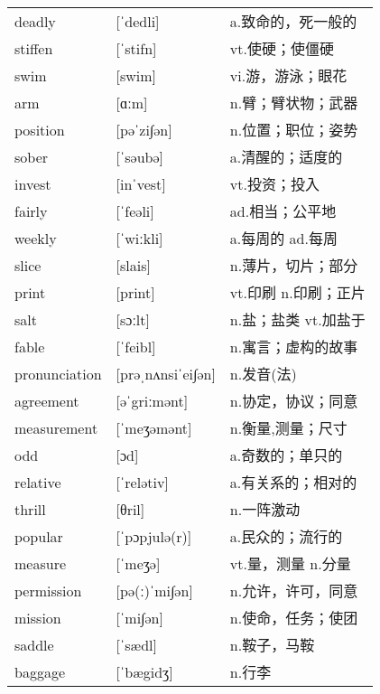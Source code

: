 \documentclass[a4paper]{article}
\begin{document}
\section{}
\begin{tabular}{l l l}

deadly & [ˈdedli] & a.致命的，死一般的 \\
stiffen & [ˈstifn] & vt.使硬；使僵硬 \\
swim & [swim] & vi.游，游泳；眼花 \\
arm & [ɑːm] & n.臂；臂状物；武器 \\
position & [pəˈzi∫ən] & n.位置；职位；姿势 \\
sober & [ˈsəubə] & a.清醒的；适度的 \\
invest & [inˈvest] & vt.投资；投入 \\
fairly & [ˈfeəli] & ad.相当；公平地 \\
weekly & [ˈwiːkli] & a.每周的 ad.每周 \\
slice & [slais] & n.薄片，切片；部分 \\
print & [print] & vt.印刷 n.印刷；正片 \\
salt & [sɔːlt] & n.盐；盐类 vt.加盐于 \\
fable & [ˈfeibl] & n.寓言；虚构的故事 \\
pronunciation & [prəˌnʌnsiˈei∫ən] & n.发音(法) \\
agreement & [əˈgriːmənt] & n.协定，协议；同意 \\
measurement & [ˈmeʒəmənt] & n.衡量,测量；尺寸 \\
odd & [ɔd] & a.奇数的；单只的 \\
relative & [ˈrelətiv] & a.有关系的；相对的 \\
thrill & [θril] & n.一阵激动 \\
popular & [ˈpɔpjulə(r)] & a.民众的；流行的 \\
measure & [ˈmeʒə] & vt.量，测量 n.分量 \\
permission & [pə(ː)ˈmi∫ən] & n.允许，许可，同意 \\
mission & [ˈmi∫ən] & n.使命，任务；使团 \\
saddle & [ˈsædl] & n.鞍子，马鞍 \\
baggage & [ˈbægidʒ] & n.行李 \\

\end{tabular}
\end{document}
